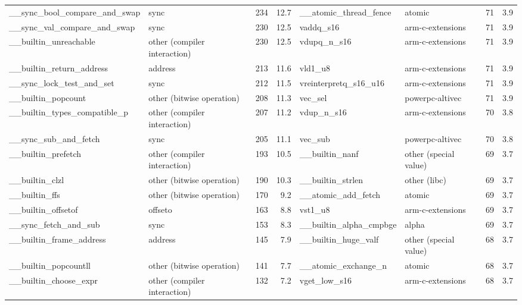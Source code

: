 {\begin{table*}
\begin{tabular}{l l r r |l l r r}
\cmidrule(lr){1-8}
\_\_sync\_bool\_compare\_and\_swap & sync & 234 & 12.7 & \_\_atomic\_thread\_fence & atomic & 71 & 3.9\\
\cmidrule(lr){1-8}
\_\_sync\_val\_compare\_and\_swap & sync & 230 & 12.5 & vaddq\_s16 & arm-c-extensions & 71 & 3.9\\
\cmidrule(lr){1-8}
\_\_builtin\_unreachable & other (compiler interaction) & 230 & 12.5 & vdupq\_n\_s16 & arm-c-extensions & 71 & 3.9\\
\cmidrule(lr){1-8}
\_\_builtin\_return\_address & address & 213 & 11.6 & vld1\_u8 & arm-c-extensions & 71 & 3.9\\
\cmidrule(lr){1-8}
\_\_sync\_lock\_test\_and\_set & sync & 212 & 11.5 & vreinterpretq\_s16\_u16 & arm-c-extensions & 71 & 3.9\\
\cmidrule(lr){1-8}
\_\_builtin\_popcount & other (bitwise operation) & 208 & 11.3 & vec\_sel & powerpc-altivec & 71 & 3.9\\
\cmidrule(lr){1-8}
\_\_builtin\_types\_compatible\_p & other (compiler interaction) & 207 & 11.2 & vdup\_n\_s16 & arm-c-extensions & 70 & 3.8\\
\cmidrule(lr){1-8}
\_\_sync\_sub\_and\_fetch & sync & 205 & 11.1 & vec\_sub & powerpc-altivec & 70 & 3.8\\
\cmidrule(lr){1-8}
\_\_builtin\_prefetch & other (compiler interaction) & 193 & 10.5 & \_\_builtin\_nanf & other (special value) & 69 & 3.7\\
\cmidrule(lr){1-8}
\_\_builtin\_clzl & other (bitwise operation) & 190 & 10.3 & \_\_builtin\_strlen & other (libc) & 69 & 3.7\\
\cmidrule(lr){1-8}
\_\_builtin\_ffs & other (bitwise operation) & 170 & 9.2 & \_\_atomic\_add\_fetch & atomic & 69 & 3.7\\
\cmidrule(lr){1-8}
\_\_builtin\_offsetof & offseto & 163 & 8.8 & vst1\_u8 & arm-c-extensions & 69 & 3.7\\
\cmidrule(lr){1-8}
\_\_sync\_fetch\_and\_sub & sync & 153 & 8.3 & \_\_builtin\_alpha\_cmpbge & alpha & 69 & 3.7\\
\cmidrule(lr){1-8}
\_\_builtin\_frame\_address & address & 145 & 7.9 & \_\_builtin\_huge\_valf & other (special value) & 68 & 3.7\\
\cmidrule(lr){1-8}
\_\_builtin\_popcountll & other (bitwise operation) & 141 & 7.7 & \_\_atomic\_exchange\_n & atomic & 68 & 3.7\\
\cmidrule(lr){1-8}
\_\_builtin\_choose\_expr & other (compiler interaction) & 132 & 7.2 & vget\_low\_s16 & arm-c-extensions & 68 & 3.7\\

\end{tabular}
\end{table*}}
